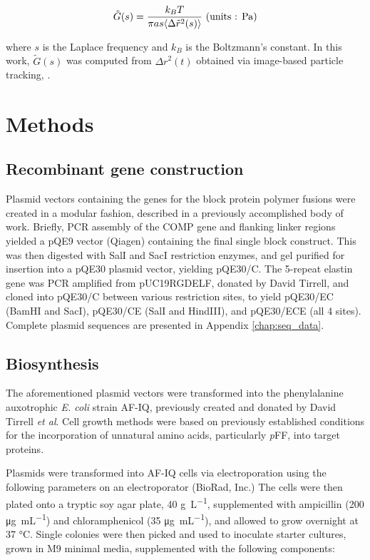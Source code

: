 \begin{refsection}
\begin{equation}
    \label{eq:stokes-einstein}
    \tilde{G}(s)=
    \frac{k_BT}{\pi a s \langle \Delta \tilde{r}^2(s) \rangle}
    \text{ (units : \si{\pascal})}
\end{equation}

where ${s}$ is the Laplace frequency and ${k_B}$ is the Boltzmann's constant. In
this work, ${\tilde{G}(s)}$ was computed from ${\Delta r^2(t)}$ obtained via
image-based particle tracking, .

\section{Methods}

\subsection{Recombinant gene construction}

Plasmid vectors containing the genes for the block protein polymer fusions were
created in a modular fashion, described in a previously accomplished body of
work.\cite{Haghpanah2009} Briefly, PCR assembly of the COMP gene and
flanking linker regions yielded a pQE9 vector (Qiagen) containing the final
single block construct.\cite{Kwon2003} This was then digested with SalI and SacI restriction
enzymes, and gel purified for insertion into a pQE30 plasmid vector, yielding
pQE30/C. The 5-repeat elastin gene was PCR amplified from pUC19RGDELF, donated
by David Tirrell, and cloned into pQE30/C between various restriction sites, to
yield pQE30/EC (BamHI and SacI), pQE30/CE (SalI and HindIII), and pQE30/ECE (all
4 sites). Complete plasmid sequences are presented in Appendix
\ref{chap:seq_data}. 

\subsection{Biosynthesis}

The aforementioned plasmid vectors were transformed into the phenylalanine
auxotrophic \emph{E. coli} strain AF-IQ, previously created and donated by David
Tirrell \emph{et al}.\cite{Yoshikawa1994,Sharma2000} Cell growth methods were based on
previously established conditions for the incorporation of unnatural amino
acids, particularly \emph{p}FF, into target
proteins.\cite{Voloshchuk2009,Yoshikawa1994}

Plasmids were transformed into AF-IQ cells via electroporation using the
following parameters on an electroporator (BioRad, Inc.) The cells were then
plated onto a tryptic soy agar plate, 40 \si{\g\per\L}, supplemented with
ampicillin (200 \si{\ug\per\mL}) and chloramphenicol (35 \si{\ug\per\mL}), and
allowed to grow overnight at 37 \si{\celsius}. Single colonies were then picked
and used to inoculate starter cultures, grown in M9 minimal media, supplemented
with the following components:


\end{refsection}
